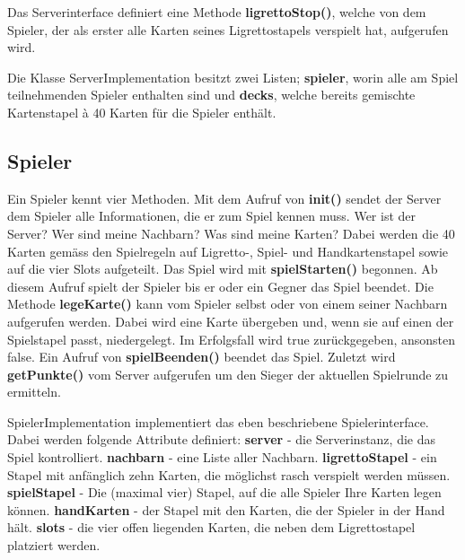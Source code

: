 Das Serverinterface definiert eine Methode {\bf ligrettoStop()}, welche von dem Spieler, der als erster alle Karten seines Ligrettostapels verspielt hat, aufgerufen wird.



Die Klasse ServerImplementation besitzt zwei Listen; {\bf spieler}, worin alle am Spiel teilnehmenden Spieler enthalten sind und {\bf decks}, welche bereits gemischte Kartenstapel à 40 Karten für die Spieler enthält.




\subsection{Spieler}

Ein Spieler kennt vier Methoden. Mit dem Aufruf von {\bf init()} sendet der Server dem Spieler alle Informationen, die er zum Spiel kennen muss. Wer ist der Server? Wer sind meine Nachbarn? Was sind meine Karten? Dabei werden die 40 Karten gemäss den Spielregeln auf Ligretto-, Spiel- und Handkartenstapel sowie auf die vier Slots aufgeteilt. Das Spiel wird mit {\bf spielStarten()} begonnen. Ab diesem Aufruf spielt der Spieler bis er oder ein Gegner das Spiel beendet. Die Methode {\bf legeKarte()} kann vom Spieler selbst oder von einem seiner Nachbarn aufgerufen werden. Dabei wird eine Karte übergeben und, wenn sie auf einen der Spielstapel passt, niedergelegt. Im Erfolgsfall wird true zurückgegeben, ansonsten false. Ein Aufruf von {\bf spielBeenden()} beendet das Spiel. Zuletzt wird {\bf getPunkte()} vom Server aufgerufen um den Sieger der aktuellen Spielrunde zu ermitteln.




SpielerImplementation implementiert das eben beschriebene Spielerinterface. Dabei werden folgende Attribute definiert: {\bf server} - die Serverinstanz, die das Spiel kontrolliert. {\bf nachbarn} - eine Liste aller Nachbarn. {\bf ligrettoStapel} - ein Stapel mit anfänglich zehn Karten, die möglichst rasch verspielt werden müssen. {\bf spielStapel} - Die (maximal vier) Stapel, auf die alle Spieler Ihre Karten legen können. {\bf handKarten} - der Stapel mit den Karten, die der Spieler in der Hand hält. {\bf slots} - die vier offen liegenden Karten, die neben dem Ligrettostapel platziert werden.





